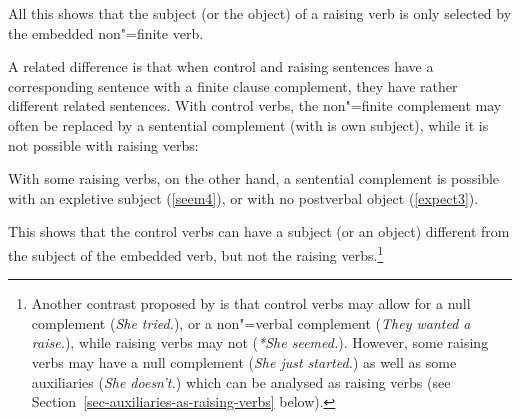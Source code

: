 \noindent
All this shows that the subject (or the object) of a raising verb is only selected by the embedded
non"=finite verb.

A related difference is that when control and raising sentences have a corresponding sentence with a finite clause complement, they have rather different related sentences.
With control verbs, the non"=finite complement may often be replaced by a sentential complement (with is own subject), while it is not possible with raising verbs:

\eal
{}
\zl

\eal
{}
\zl
{}

With some raising verbs, on the other hand, a sentential complement is possible with an expletive
subject (\ref{seem4}), or with no postverbal object (\ref{expect3}). 

\eal
{}
\zl

\noindent
This shows that the control verbs can have a subject (or an object) different from the subject of
the embedded verb, but not the raising verbs.\footnote{%
  Another contrast proposed by
  \citet{Jacobson1990}\iaddpages is that control verbs may allow for a null complement (\emph{She tried.}), or
  a non"=verbal complement (\emph{They wanted a raise.}), while raising verbs may not (\emph{*She
    seemed.}). However, some raising verbs may have a null complement (\emph{She just
    started.}) as
  well as some auxiliaries (\emph{She doesn't.}) which can be analysed as raising verbs (see
  Section~\ref{sec-auxiliaries-as-raising-verbs} below).%
} 

